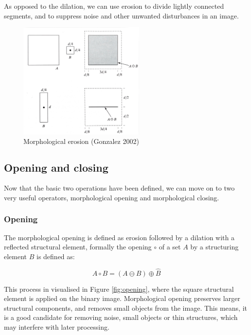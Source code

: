 \documentclass[
  digital,     %
  oneside,     %
  nosansbold,  %
  nocolorbold, %
  lof,         %
  lot,         %
]{fithesis4}
\begin{document}
As opposed to the dilation, we can use erosion to divide lightly connected
segments, and to suppress noise and other unwanted disturbances in an image.

\begin{figure}
    \begin{center}
        \includegraphics[width=6.3cm]{resources/morph_erosion.jpg}
    \end{center}
    \caption{Morphological erosion (Gonzalez 2002)} %
    \label{fig:morph_erosion}
\end{figure}

\subsection{Opening and closing}

Now that the basic two operations have been defined, we can move on to two
very useful operators, morphological opening and morphological closing.

\subsubsection{Opening}

The morphological opening is defined as erosion followed by a dilation with a
reflected structural element, formally the opening $\circ$ of a set $A$ by a structuring
element $B$ is defined as\cite{soile2004}: 

$$A \circ B = (A \ominus B) \oplus \hat{B} $$

This process in visualised in Figure \ref{fig:opening}, where the square
structural element is applied on the binary image. Morphological opening
preserves larger structural components, and removes small objects from the
image. This means, it is a good candidate for removing noise, small objects or
thin structures, which may interfere with later processing.
\end{document}
